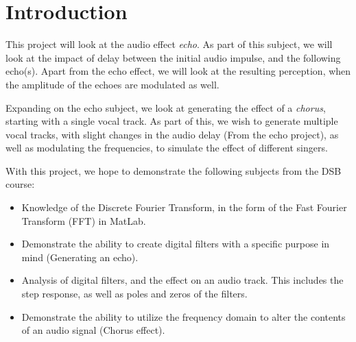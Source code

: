 
\section{Introduction}
This project will look at the audio effect \emph{echo}. As part of this subject, we will look at the impact of delay between the initial audio impulse, and the following echo(s). Apart from the echo effect, we will look at the resulting perception, when the amplitude of the echoes are modulated as well.

Expanding on the echo subject, we look at generating the effect of a \emph{chorus}, starting with a single vocal track. As part of this, we wish to generate multiple vocal tracks, with slight changes in the audio delay (From the echo project), as well as modulating the frequencies, to simulate the effect of different singers.

With this project, we hope to demonstrate the following subjects from the DSB course:
\begin{itemize}
	\item Knowledge of the Discrete Fourier Transform, in the form of the Fast Fourier Transform (FFT) in MatLab.
	\item Demonstrate the ability to create digital filters with a specific purpose in mind (Generating an echo).
	\item Analysis of digital filters, and the effect on an audio track. This includes the step response, as well as poles and zeros of the filters.
	\item Demonstrate the ability to utilize the frequency domain to alter the contents of an audio signal (Chorus effect).
\end{itemize}

